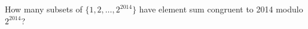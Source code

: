 How many subsets of $\{1,2,\ldots,2^{2014}\}$ have element sum congruent to 2014 modulo $ 2^{2014}$?
